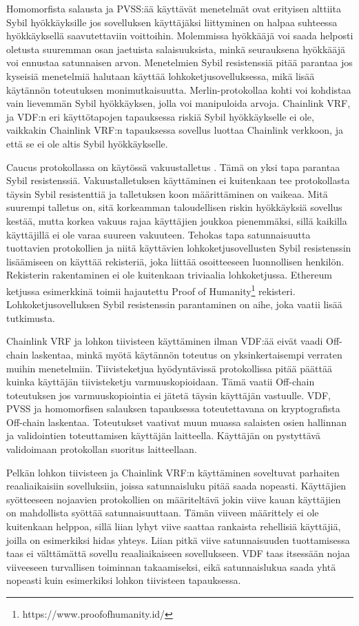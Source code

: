 Homomorfista salausta ja PVSS:ää käyttävät menetelmät ovat erityisen alttiita Sybil hyökkäyksille jos sovelluksen käyttäjäksi liittyminen on halpaa suhteessa hyökkäyksellä saavutettaviin voittoihin. Molemmissa hyökkääjä voi saada helposti oletusta suuremman osan jaetuista salaisuuksista, minkä seurauksena hyökkääjä voi ennustaa satunnaisen arvon. Menetelmien Sybil resistenssiä pitää parantaa jos kyseisiä menetelmiä halutaan käyttää lohkoketjusovelluksessa, mikä lisää käytännön toteutuksen monimutkaisuutta. Merlin-protokollaa kohti voi kohdistaa vain lievemmän Sybil hyökkäyksen, jolla voi manipuloida arvoja. Chainlink VRF, ja VDF:n eri käyttötapojen tapauksessa riskiä Sybil hyökkäykselle ei ole, vaikkakin Chainlink VRF:n tapauksessa sovellus luottaa Chainlink verkkoon, ja että se ei ole altis Sybil hyökkäykselle.

Caucus protokollassa on käytössä vakuustalletus \cite{Caucus}. Tämä on yksi tapa parantaa Sybil resistenssiä. Vakuustalletuksen käyttäminen ei kuitenkaan tee protokollasta täysin Sybil resistenttiä ja talletuksen koon määrittäminen on vaikeaa. Mitä suurempi talletus on, sitä korkeamman taloudellisen riskin hyökkäyksiä sovellus kestää, mutta korkea vakuus rajaa käyttäjien joukkoa pienemmäksi, sillä kaikilla käyttäjillä ei ole varaa suureen vakuuteen. Tehokas tapa satunnaisuutta tuottavien protokollien ja niitä käyttävien lohkoketjusovellusten Sybil resistenssin lisäämiseen on käyttää rekisteriä, joka liittää osoitteeseen luonnollisen henkilön. Rekisterin rakentaminen ei ole kuitenkaan triviaalia lohkoketjussa. Ethereum ketjussa esimerkkinä toimii hajautettu Proof of Humanity\footnote{https://www.proofofhumanity.id/} rekisteri. Lohkoketjusovelluksen Sybil resistenssin parantaminen on aihe, joka vaatii lisää tutkimusta.

Chainlink VRF ja lohkon tiivisteen käyttäminen ilman VDF:ää eivät vaadi Off-chain laskentaa, minkä myötä käytännön toteutus on yksinkertaisempi verraten muihin menetelmiin. Tiivisteketjua hyödyntävissä protokollissa pitää päättää kuinka käyttäjän tiivisteketju varmuuskopioidaan. Tämä vaatii Off-chain toteutuksen jos varmuuskopiointia ei jätetä täysin käyttäjän vastuulle. VDF, PVSS ja homomorfisen salauksen tapauksessa toteutettavana on kryptografista Off-chain laskentaa. Toteutukset vaativat muun muassa salaisten osien hallinnan ja validointien toteuttamisen käyttäjän laitteella. Käyttäjän on pystyttävä validoimaan protokollan suoritus laitteellaan.

Pelkän lohkon tiivisteen ja Chainlink VRF:n käyttäminen soveltuvat parhaiten reaaliaikaisiin sovelluksiin, joissa satunnaisluku pitää saada nopeasti. Käyttäjien syötteeseen nojaavien protokollien on määriteltävä jokin viive kauan käyttäjien on mahdollista syöttää satunnaisuuttaan. Tämän viiveen määrittely ei ole kuitenkaan helppoa, sillä liian lyhyt viive saattaa rankaista rehellisiä käyttäjiä, joilla on esimerkiksi hidas yhteys. Liian pitkä viive satunnaisuuden tuottamisessa taas ei välttämättä sovellu reaaliaikaiseen sovellukseen. VDF taas itsessään nojaa viiveeseen turvallisen toiminnan takaamiseksi, eikä satunnaislukua saada yhtä nopeasti kuin esimerkiksi lohkon tiivisteen tapauksessa.

